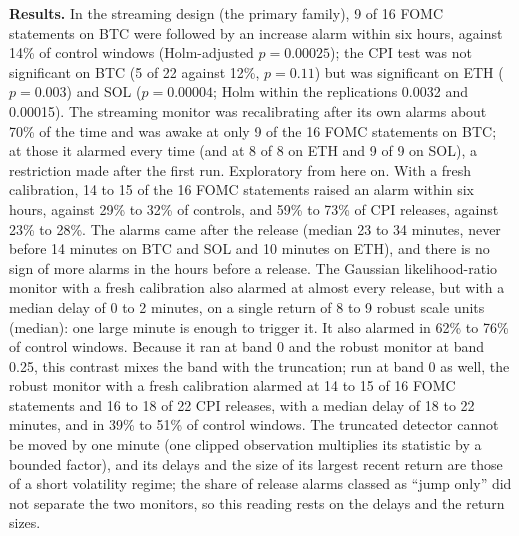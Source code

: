 \documentclass[
]{article}
\begin{document}
\textbf{Results.} In the streaming design (the primary family), 9 of 16
FOMC statements on BTC were followed by an increase alarm within six
hours, against 14\% of control windows (Holm-adjusted \(p = 0.00025\));
the CPI test was not significant on BTC (5 of 22 against 12\%,
\(p = 0.11\)) but was significant on ETH (\(p = 0.003\)) and SOL
(\(p = 0.00004\); Holm within the replications 0.0032 and 0.00015). The
streaming monitor was recalibrating after its own alarms about 70\% of
the time and was awake at only 9 of the 16 FOMC statements on BTC; at
those it alarmed every time (and at 8 of 8 on ETH and 9 of 9 on SOL), a
restriction made after the first run. Exploratory from here on. With a
fresh calibration, 14 to 15 of the 16 FOMC statements raised an alarm
within six hours, against 29\% to 32\% of controls, and 59\% to 73\% of
CPI releases, against 23\% to 28\%. The alarms came after the release
(median 23 to 34 minutes, never before 14 minutes on BTC and SOL and 10
minutes on ETH), and there is no sign of more alarms in the hours before
a release. The Gaussian likelihood-ratio monitor with a fresh
calibration also alarmed at almost every release, but with a median
delay of 0 to 2 minutes, on a single return of 8 to 9 robust scale units
(median): one large minute is enough to trigger it. It also alarmed in
62\% to 76\% of control windows. Because it ran at band 0 and the robust
monitor at band 0.25, this contrast mixes the band with the truncation;
run at band 0 as well, the robust monitor with a fresh calibration
alarmed at 14 to 15 of 16 FOMC statements and 16 to 18 of 22 CPI
releases, with a median delay of 18 to 22 minutes, and in 39\% to 51\%
of control windows. The truncated detector cannot be moved by one minute
(one clipped observation multiplies its statistic by a bounded factor),
and its delays and the size of its largest recent return are those of a
short volatility regime; the share of release alarms classed as ``jump
only'' did not separate the two monitors, so this reading rests on the
delays and the return sizes.
\end{document}
